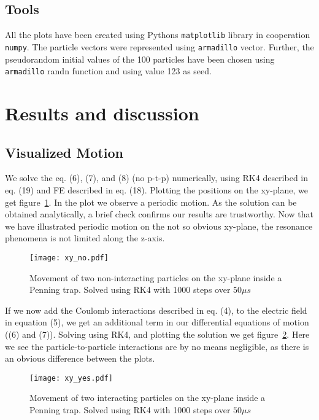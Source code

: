 \documentclass[english,notitlepage,reprint,nofootinbib]{revtex4-1}
\begin{document}
\subsection*{Tools}
All the plots have been created using Pythons \texttt{matplotlib} library in cooperation \texttt{numpy}. The particle vectors were represented using \texttt{armadillo} vector. Further, the pseudorandom initial values of the 100 particles have been chosen using \texttt{armadillo} randn function and using value 123 as seed.



\section{Results and discussion}\label{sec:results_and_discussion}

\subsection*{Visualized Motion}


We solve the eq. (6), (7), and (8) (no p-t-p) numerically, using RK4 described in eq. (19) and FE described in eq. (18). Plotting the positions on the xy-plane, we get figure~\ref{fig:xy_no}. In the plot we observe a periodic motion. As the solution can be obtained analytically, a brief check confirms our results are trustworthy. Now that we have illustrated periodic motion on the not so obvious xy-plane, the resonance phenomena is not limited along the z-axis.
\FloatBarrier
\begin{figure}[!htb]
    \centering %
    \texttt{[image: xy\_no.pdf]} %
    \caption{Movement of two non-interacting particles on the xy-plane inside a Penning trap. Solved using RK4 with 1000 steps over $50 \mu s$}
    \label{fig:xy_no}
\end{figure}
\FloatBarrier

If we now add the Coulomb interactions described in eq. (4), to the electric field in equation (5), we get an additional term in our differential equations of motion ((6) and (7)). Solving using RK4, and plotting the solution we get figure~\ref{fig:xy_yes}. Here we see the particle-to-particle interactions are by no means negligible, as there is an obvious difference between the plots.

\FloatBarrier
\begin{figure}[!htb]
    \centering %
    \texttt{[image: xy\_yes.pdf]} %
    \caption{Movement of two interacting particles on the xy-plane inside a Penning trap. Solved using RK4 with 1000 steps over $50 \mu s$}
    \label{fig:xy_yes}
\end{figure}
\FloatBarrier
\end{document}
